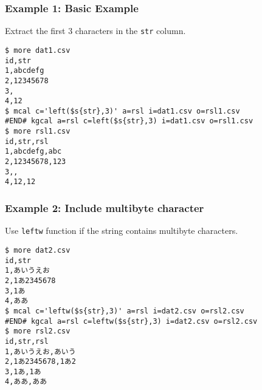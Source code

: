 \subsubsection*{Example 1: Basic Example}

Extract the first 3 characters in the \verb|str| column.


\begin{Verbatim}[baselinestretch=0.7,frame=single]
$ more dat1.csv
id,str
1,abcdefg
2,12345678
3,
4,12
$ mcal c='left($s{str},3)' a=rsl i=dat1.csv o=rsl1.csv
#END# kgcal a=rsl c=left($s{str},3) i=dat1.csv o=rsl1.csv
$ more rsl1.csv
id,str,rsl
1,abcdefg,abc
2,12345678,123
3,,
4,12,12
\end{Verbatim}
\subsubsection*{Example 2: Include multibyte character}

Use \verb|leftw| function if the string contains multibyte characters.


\begin{Verbatim}[baselinestretch=0.7,frame=single]
$ more dat2.csv
id,str
1,あいうえお
2,1あ2345678
3,1あ
4,ああ
$ mcal c='leftw($s{str},3)' a=rsl i=dat2.csv o=rsl2.csv
#END# kgcal a=rsl c=leftw($s{str},3) i=dat2.csv o=rsl2.csv
$ more rsl2.csv
id,str,rsl
1,あいうえお,あいう
2,1あ2345678,1あ2
3,1あ,1あ
4,ああ,ああ
\end{Verbatim}
